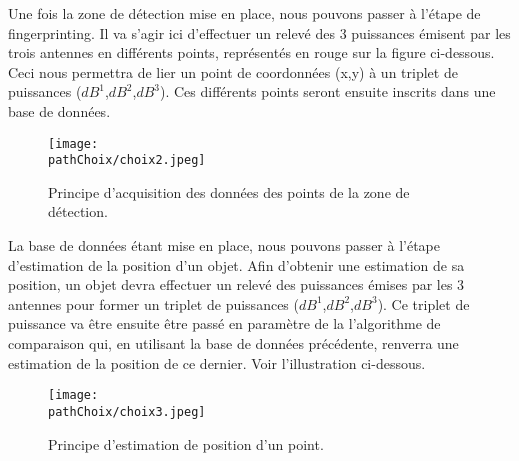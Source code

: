 Une fois la zone de détection mise en place, nous pouvons passer à l'étape de fingerprinting.
Il va s'agir ici d'effectuer un relevé des 3 puissances émisent par les trois antennes en différents points, représentés en rouge sur la figure ci-dessous.
Ceci nous permettra de lier un point de coordonnées (x,y) à un triplet de puissances ($dB^{1}$,$dB^{2}$,$dB^{3}$). Ces différents points seront ensuite inscrits dans une base de données.\\


\begin{figure}[H]
\centering
\texttt{[image: \\pathChoix/choix2.jpeg]}
\caption{Principe d'acquisition des données des points de la zone de détection.}
\end{figure}


La base de données étant mise en place, nous pouvons passer à l'étape d'estimation de la position d'un objet.
Afin d'obtenir une estimation de sa position, un objet devra effectuer un relevé des puissances émises par les 3 antennes pour former un triplet de puissances ($dB^{1}$,$dB^{2}$,$dB^{3}$).
Ce triplet de puissance va être ensuite être passé en paramètre de la l'algorithme de comparaison qui, en utilisant la base de données précédente, renverra une estimation de la position de ce dernier. Voir l'illustration ci-dessous.


\begin{figure}[H]
\centering
\texttt{[image: \\pathChoix/choix3.jpeg]}
\caption{Principe d'estimation de position d'un point.}
\end{figure}
\newpage


